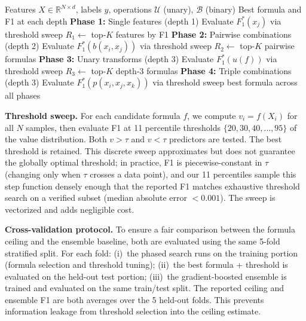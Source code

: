 \documentclass[journal]{IEEEtran}
\begin{document}
\begin{algorithm}[t]
\caption{Phased Symbolic Search (Phases~1--2 exhaustive; 3--4 filtered)}
\label{alg:search}
\begin{algorithmic}[1]
\Require Features $X \in \mathbb{R}^{N \times d}$, labels $y$,
operations $\mathcal{U}$ (unary), $\mathcal{B}$ (binary)
\Ensure Best formula and F1 at each depth
\Statex
\Statex \textbf{Phase 1:} Single features (depth 1)
    \State Evaluate $F_1^*(x_j)$ via threshold sweep
\EndFor
\State $R_1 \gets$ top-$K$ features by F1
\Statex
\Statex \textbf{Phase 2:} Pairwise combinations (depth 2)
    \State Evaluate $F_1^*(b(x_i, x_j))$ via threshold sweep
\EndFor
\State $R_2 \gets$ top-$K$ pairwise formulas
\Statex
\Statex \textbf{Phase 3:} Unary transforms (depth 3)
    \State Evaluate $F_1^*(u(f))$ via threshold sweep
\EndFor
\State $R_3 \gets$ top-$K$ depth-3 formulas
\Statex
\Statex \textbf{Phase 4:} Triple combinations (depth 3)
    \State Evaluate $F_1^*(p(x_i, x_j, x_k))$ via threshold sweep
\EndFor
\State \Return best formula across all phases
\end{algorithmic}
\end{algorithm}

\textbf{Threshold sweep.} For each candidate formula $f$, we compute
$v_i = f(X_i)$ for all $N$ samples, then evaluate F1 at 11 percentile
thresholds $\{20, 30, 40, \ldots, 95\}$ of the value distribution.
Both $v > \tau$ and $v < \tau$ predictors are tested. The best
threshold is retained. This discrete sweep approximates but does not
guarantee the globally optimal threshold; in practice, F1 is
piecewise-constant in $\tau$ (changing only when $\tau$ crosses a
data point), and our 11 percentiles sample this step function densely
enough that the reported F1 matches exhaustive threshold search on
a verified subset (median absolute error $< 0.001$).
The sweep is vectorized and adds negligible cost.

\textbf{Cross-validation protocol.} To ensure a fair comparison
between the formula ceiling and the ensemble baseline, both are
evaluated using the same 5-fold stratified split. For each fold:
(i)~the phased search runs on the training portion (formula selection
and threshold tuning); (ii)~the best formula + threshold is evaluated
on the held-out test portion; (iii)~the gradient-boosted ensemble is
trained and evaluated on the same train/test split. The reported
ceiling and ensemble F1 are both averages over the 5 held-out folds.
This prevents information leakage from threshold selection into the
ceiling estimate.
\end{document}
